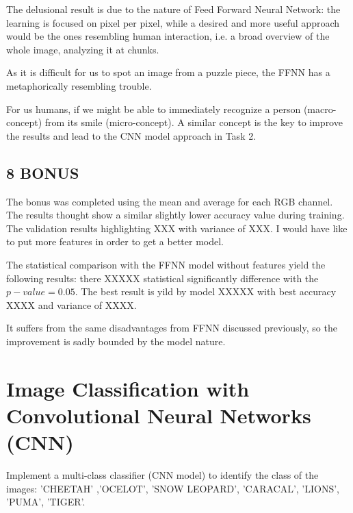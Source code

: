 \documentclass[11pt]{scrartcl}
\begin{document}
The delusional result is due to the nature of Feed Forward Neural Network:
the learning is focused on pixel per pixel,
while a desired and more useful approach would be the ones resembling human interaction,
i.e. a broad overview of the whole image,
analyzing it at chunks.

As it is difficult for us to spot an image from a puzzle piece,
the FFNN has a metaphorically resembling trouble.

For us humans, if we might be able to immediately recognize a person (macro-concept) 
from its smile (micro-concept).
A similar concept is the key to improve the results 
and lead to the CNN model approach in Task 2.


\subsection*{8 BONUS}

The bonus was completed using the mean and average for each RGB channel.
The results thought show a similar slightly lower accuracy value during training.
The validation results highlighting XXX with variance of XXX.
I would have like to put more features in order to get a better model.

The statistical comparison with the FFNN model without features yield 
the following results:
there XXXXX statistical significantly difference with the \( p-value = 0.05 \).
The best result is yild by model XXXXX with best accuracy XXXX and variance of XXXX.

It suffers from the same disadvantages from FFNN discussed previously,
so the improvement is sadly bounded by the model nature.

\newpage

\section{Image Classification with Convolutional Neural Networks (CNN)}

Implement a multi-class classifier (CNN model) to identify the class of the images: 
'CHEETAH' ,'OCELOT', 'SNOW LEOPARD', 'CARACAL', 'LIONS', 'PUMA', 'TIGER'.
\end{document}
